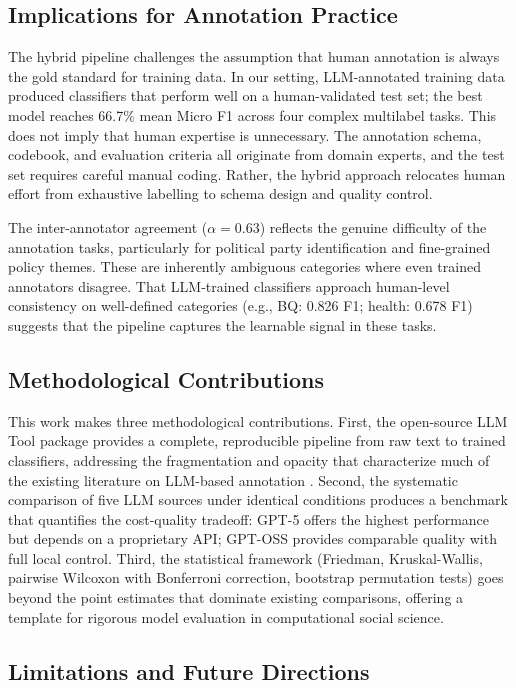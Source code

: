 \documentclass[12pt]{article}
\begin{document}
\subsection{Implications for Annotation Practice}

The hybrid pipeline challenges the assumption that human annotation is always the gold standard for training data. In our setting, LLM-annotated training data produced classifiers that perform well on a human-validated test set; the best model reaches 66.7\% mean Micro F1 across four complex multilabel tasks. This does not imply that human expertise is unnecessary. The annotation schema, codebook, and evaluation criteria all originate from domain experts, and the test set requires careful manual coding. Rather, the hybrid approach relocates human effort from exhaustive labelling to schema design and quality control.

The inter-annotator agreement ($\alpha = 0.63$) reflects the genuine difficulty of the annotation tasks, particularly for political party identification and fine-grained policy themes. These are inherently ambiguous categories where even trained annotators disagree. That LLM-trained classifiers approach human-level consistency on well-defined categories (e.g., BQ: 0.826 F1; health: 0.678 F1) suggests that the pipeline captures the learnable signal in these tasks.

\subsection{Methodological Contributions}

This work makes three methodological contributions. First, the open-source LLM Tool package provides a complete, reproducible pipeline from raw text to trained classifiers, addressing the fragmentation and opacity that characterize much of the existing literature on LLM-based annotation \parencite{weber_reichardt23}. Second, the systematic comparison of five LLM sources under identical conditions produces a benchmark that quantifies the cost-quality tradeoff: GPT-5 offers the highest performance but depends on a proprietary API; GPT-OSS provides comparable quality with full local control. Third, the statistical framework (Friedman, Kruskal-Wallis, pairwise Wilcoxon with Bonferroni correction, bootstrap permutation tests) goes beyond the point estimates that dominate existing comparisons, offering a template for rigorous model evaluation in computational social science.

\subsection{Limitations and Future Directions}
\end{document}
